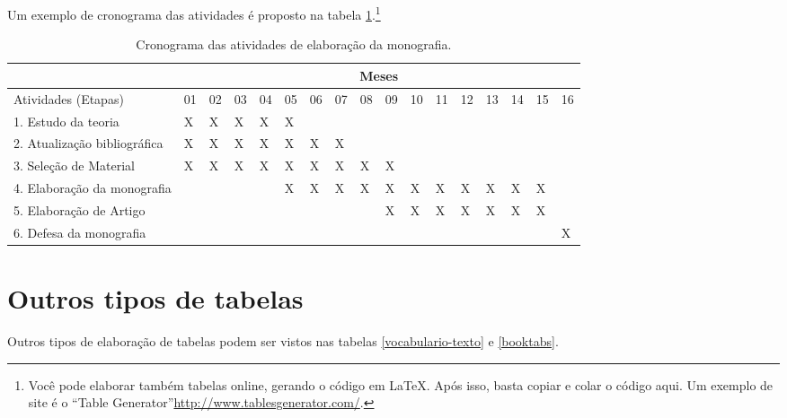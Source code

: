 Um exemplo de cronograma das atividades é proposto na tabela \ref{tab:cronograma}.\footnote{Voc{\^e} pode elaborar também tabelas online, gerando o código em \LaTeX. Após isso, basta copiar e colar o código aqui. Um exemplo de site é o ``Table Generator''\url{http://www.tablesgenerator.com/}.}
  
\begin{table}[h]
\ABNTEXfontereduzida
\caption[Cronograma das atividades]{Cronograma das atividades de elaboração da monografia.}
\label{tab:cronograma}
\begin{minipage}{0.3\textwidth}
    \centering
\begin{tabular}{|l|l|l|l|l|l|l|l|l|l|l|l|l|l|l|l|l|}
\hline
                             & \multicolumn{16}{c|}{Meses}                                                   \\ \hline
Atividades (Etapas)          & 01 & 02 & 03 & 04 & 05 & 06 & 07 & 08 & 09 & 10 & 11 & 12 & 13 & 14 & 15 & 16 \\ \hline
1. Estudo da teoria          & X  & X  & X  & X  & X  &    &    &    &    &    &    &    &    &    &    &    \\ \hline
2. Atualização bibliográfica & X  & X  & X  & X  & X  & X  & X  &    &    &    &    &    &    &    &    &    \\ \hline
3. Seleção de Material       & X  & X  & X  & X  & X  & X  & X  & X  & X  &    &    &    &    &    &    &    \\ \hline
4. Elaboração da monografia  &    &    &    &    & X  & X  & X  & X  & X  & X  & X  & X  & X  & X  & X  &    \\ \hline
5. Elaboração de Artigo      &    &    &    &    &    &    &    &    & X  & X  & X  & X  & X  & X  & X  &    \\ \hline
6. Defesa da monografia      &    &    &    &    &    &    &    &    &    &    &    &    &    &    &    & X  \\ \hline
\end{tabular}
  \end{minipage}
\end{table}

\section{Outros tipos de tabelas}

Outros tipos de elaboração de tabelas podem ser vistos nas tabelas \ref{vocabulario-texto} e \ref{booktabs}.

